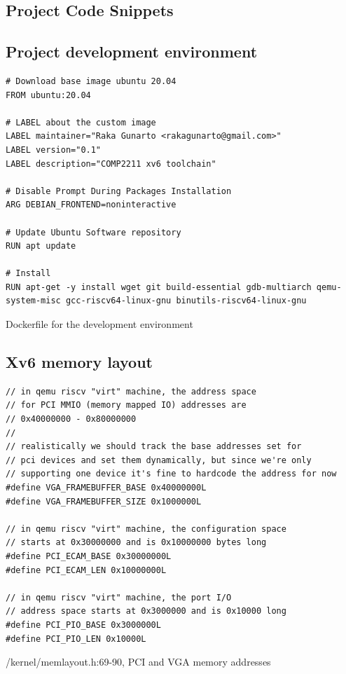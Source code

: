 \begin{appendices}
%
%

\chapter{Project Code Snippets}
\section{Project development environment}
\label{appendix:c:1}
\begin{listing}[H]
    \begin{verbatim}
# Download base image ubuntu 20.04
FROM ubuntu:20.04

# LABEL about the custom image
LABEL maintainer="Raka Gunarto <rakagunarto@gmail.com>"
LABEL version="0.1"
LABEL description="COMP2211 xv6 toolchain"

# Disable Prompt During Packages Installation
ARG DEBIAN_FRONTEND=noninteractive

# Update Ubuntu Software repository
RUN apt update

# Install
RUN apt-get -y install wget git build-essential gdb-multiarch qemu-system-misc gcc-riscv64-linux-gnu binutils-riscv64-linux-gnu
    \end{verbatim}
    \caption{Dockerfile for the development environment}
\end{listing}
\section{Xv6 memory layout}
\label{appendix:c:2}
\begin{listing}[H]
\begin{verbatim}
// in qemu riscv "virt" machine, the address space
// for PCI MMIO (memory mapped IO) addresses are
// 0x40000000 - 0x80000000
//
// realistically we should track the base addresses set for
// pci devices and set them dynamically, but since we're only
// supporting one device it's fine to hardcode the address for now
#define VGA_FRAMEBUFFER_BASE 0x40000000L
#define VGA_FRAMEBUFFER_SIZE 0x1000000L

// in qemu riscv "virt" machine, the configuration space
// starts at 0x30000000 and is 0x10000000 bytes long
#define PCI_ECAM_BASE 0x30000000L
#define PCI_ECAM_LEN 0x10000000L

// in qemu riscv "virt" machine, the port I/O
// address space starts at 0x3000000 and is 0x10000 long
#define PCI_PIO_BASE 0x3000000L
#define PCI_PIO_LEN 0x10000L
\end{verbatim}
\caption{/kernel/memlayout.h:69-90, PCI and VGA memory addresses}
\end{listing}


\end{appendices}
